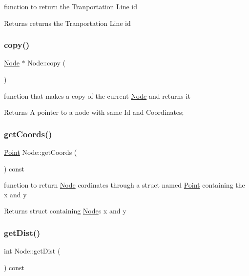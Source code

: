 function to return the Tranportation Line id 

\begin{DoxyReturn}{Returns}
returns the Tranportation Line id 
\end{DoxyReturn}
\mbox{\label{class_node_a8557bfd8ff3979e326611dd919f1987d}} 
\subsubsection{\texorpdfstring{copy()}{copy()}}
{\footnotesize\ttfamily \hyperlink{class_node}{Node} $\ast$ Node\+::copy (\begin{DoxyParamCaption}{ }\end{DoxyParamCaption})}



function that makes a copy of the current \hyperlink{class_node}{Node} and returns it 

\begin{DoxyReturn}{Returns}
A pointer to a node with same Id and Coordinates; 
\end{DoxyReturn}
\mbox{\label{class_node_a1911ad83f5ebe9ba596e70d6901bb7b5}} 
\subsubsection{\texorpdfstring{get\+Coords()}{getCoords()}}
{\footnotesize\ttfamily \hyperlink{struct_point}{Point} Node\+::get\+Coords (\begin{DoxyParamCaption}{ }\end{DoxyParamCaption}) const}



function to return \hyperlink{class_node}{Node} cordinates through a struct named \hyperlink{struct_point}{Point} containing the x and y 

\begin{DoxyReturn}{Returns}
struct containing \hyperlink{class_node}{Node}\textquotesingle{}s x and y 
\end{DoxyReturn}
\mbox{\label{class_node_a0b0c45c65266a320dc0c1c24a226fc12}} 
\subsubsection{\texorpdfstring{get\+Dist()}{getDist()}}
{\footnotesize\ttfamily int Node\+::get\+Dist (\begin{DoxyParamCaption}{ }\end{DoxyParamCaption}) const}



